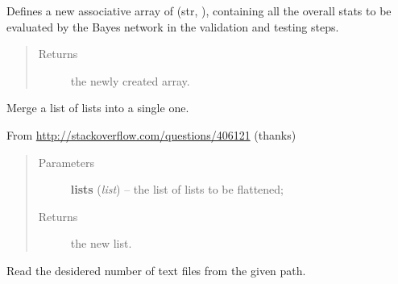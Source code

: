 \documentclass[letterpaper,10pt,english]{sphinxmanual}
\begin{document}
\begin{fulllineitems}
\begin{fulllineitems}
\begin{quote}
\begin{description}
\end{description}\end{quote}

\end{fulllineitems}


\begin{fulllineitems}
\label{index:utils.Utils.create_test_stats}
Defines a new associative array of (str, ),
containing all the overall stats to be evaluated by the Bayes network
in the validation and testing steps.
\begin{quote}\begin{description}
\item[{Returns}] \leavevmode
the newly created array.

\end{description}\end{quote}

\end{fulllineitems}


\begin{fulllineitems}
\label{index:utils.Utils.merge_lists}
Merge a list of lists into a single one.

From \href{http://stackoverflow.com/questions/406121}{http://stackoverflow.com/questions/406121} (thanks)
\begin{quote}\begin{description}
\item[{Parameters}] \leavevmode
\textbf{lists} (\emph{list}) -- the list of lists to be flattened;

\item[{Returns}] \leavevmode
the new list.

\end{description}\end{quote}

\end{fulllineitems}


\begin{fulllineitems}
\label{index:utils.Utils.read_mails}
Read the desidered number of text files from the given path.


\end{fulllineitems}
\end{fulllineitems}
\end{document}

